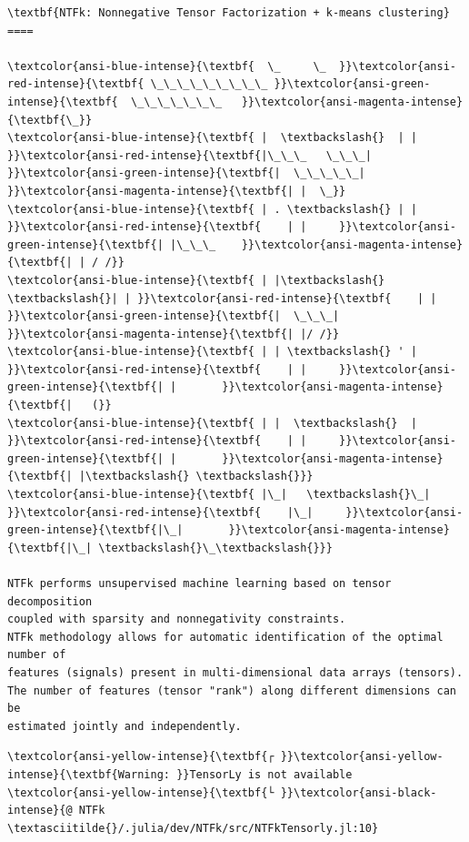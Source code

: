 \documentclass[11pt]{article}
\begin{document}
    \begin{Verbatim}[commandchars=\\\{\}]
\textbf{NTFk: Nonnegative Tensor Factorization + k-means clustering}
====

\textcolor{ansi-blue-intense}{\textbf{  \_     \_  }}\textcolor{ansi-red-intense}{\textbf{ \_\_\_\_\_\_\_\_\_ }}\textcolor{ansi-green-intense}{\textbf{  \_\_\_\_\_\_\_   }}\textcolor{ansi-magenta-intense}{\textbf{\_}}
\textcolor{ansi-blue-intense}{\textbf{ |  \textbackslash{}  | | }}\textcolor{ansi-red-intense}{\textbf{|\_\_\_   \_\_\_| }}\textcolor{ansi-green-intense}{\textbf{|  \_\_\_\_\_| }}\textcolor{ansi-magenta-intense}{\textbf{| |  \_}}
\textcolor{ansi-blue-intense}{\textbf{ | . \textbackslash{} | | }}\textcolor{ansi-red-intense}{\textbf{    | |     }}\textcolor{ansi-green-intense}{\textbf{| |\_\_\_    }}\textcolor{ansi-magenta-intense}{\textbf{| | / /}}
\textcolor{ansi-blue-intense}{\textbf{ | |\textbackslash{} \textbackslash{}| | }}\textcolor{ansi-red-intense}{\textbf{    | |     }}\textcolor{ansi-green-intense}{\textbf{|  \_\_\_|   }}\textcolor{ansi-magenta-intense}{\textbf{| |/ /}}
\textcolor{ansi-blue-intense}{\textbf{ | | \textbackslash{} ' | }}\textcolor{ansi-red-intense}{\textbf{    | |     }}\textcolor{ansi-green-intense}{\textbf{| |       }}\textcolor{ansi-magenta-intense}{\textbf{|   (}}
\textcolor{ansi-blue-intense}{\textbf{ | |  \textbackslash{}  | }}\textcolor{ansi-red-intense}{\textbf{    | |     }}\textcolor{ansi-green-intense}{\textbf{| |       }}\textcolor{ansi-magenta-intense}{\textbf{| |\textbackslash{} \textbackslash{}}}
\textcolor{ansi-blue-intense}{\textbf{ |\_|   \textbackslash{}\_| }}\textcolor{ansi-red-intense}{\textbf{    |\_|     }}\textcolor{ansi-green-intense}{\textbf{|\_|       }}\textcolor{ansi-magenta-intense}{\textbf{|\_| \textbackslash{}\_\textbackslash{}}}

NTFk performs unsupervised machine learning based on tensor decomposition
coupled with sparsity and nonnegativity constraints.
NTFk methodology allows for automatic identification of the optimal number of
features (signals) present in multi-dimensional data arrays (tensors).
The number of features (tensor "rank") along different dimensions can be
estimated jointly and independently.
    \end{Verbatim}

    \begin{Verbatim}[commandchars=\\\{\}]
\textcolor{ansi-yellow-intense}{\textbf{┌ }}\textcolor{ansi-yellow-intense}{\textbf{Warning: }}TensorLy is not available
\textcolor{ansi-yellow-intense}{\textbf{└ }}\textcolor{ansi-black-intense}{@ NTFk \textasciitilde{}/.julia/dev/NTFk/src/NTFkTensorly.jl:10}
    \end{Verbatim}
\end{document}
